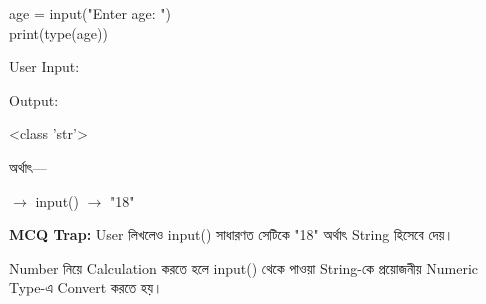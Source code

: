 \noindent
\begin{minipage}[t]{0.49\linewidth}

\begin{codebox}
\begin{english}
\ttfamily
age = input("Enter age: ")\\
print(type(age))
\end{english}
\end{codebox}

User Input:

\begin{codebox}
\begin{english}
\end{english}
\end{codebox}

\end{minipage}
\hfill
\begin{minipage}[t]{0.49\linewidth}

Output:

\begin{codebox}
\begin{english}
\ttfamily
<class 'str'>
\end{english}
\end{codebox}

অর্থাৎ—

\begin{center}
\textenglish{}
\(\longrightarrow\)
\textenglish{\ttfamily input()}
\(\longrightarrow\)
\textenglish{\ttfamily "18"}
\end{center}

\end{minipage}

\begin{rememberbox}
\textbf{\color{deepOrange}MCQ Trap:}
User
\textenglish{}
লিখলেও
\textenglish{\ttfamily input()}
সাধারণত সেটিকে
\textenglish{\ttfamily "18"}
অর্থাৎ String হিসেবে দেয়।
\end{rememberbox}



Number নিয়ে Calculation করতে হলে
\textenglish{\ttfamily input()}
থেকে পাওয়া String-কে প্রয়োজনীয় Numeric Type-এ Convert করতে হয়।

